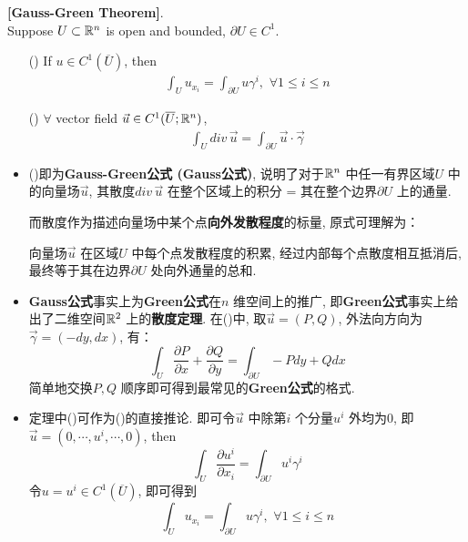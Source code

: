 	\begin{thm}\label{thm 1.6.1}
		\textbf{[Gauss-Green Theorem]}. \\
		Suppose $U \subset \mathbb{R}^n$ is open and bounded, $\partial U \in C^1$.
		\begin{enumerate}
			\item[(\rmnum{1})] If $u \in C^{1}(\overline{U})$, then
			\begin{align}
				\int_{U} u_{x_i} = \int_{\partial U} u \gamma^i , \,\, \forall 1 \leq i \leq n
			\end{align}
			
			\item[(\rmnum{2})] $\forall$ vector field $\vec{u} \in C^{1}(\overline{U} ; \mathbb{R}^n)$,
			\begin{align}
				\int_{U} div \, \vec{u} = \int_{\partial U} \vec{u} \cdot \vec{\gamma}
			\end{align}
		\end{enumerate}
		
		\vspace{2em}
		
		\begin{rmk}
			\begin{itemize}
				\item ()即为\textbf{Gauss-Green公式 (Gauss公式)}, 说明了对于$\mathbb{R}^n$ 中任一有界区域$U$ 中的向量场$\vec{u}$, 其散度$div \, \vec{u}$ 在整个区域上的积分 = 其在整个边界$\partial U$ 上的通量.
				
				\vspace{1em}
				
				而散度作为描述向量场中某个点\textbf{向外发散程度}的标量, 原式可理解为：
				\begin{center}
					向量场$\vec{u}$ 在区域$U$ 中每个点发散程度的积累, 经过内部每个点散度相互抵消后, 最终等于其在边界$\partial U$ 处向外通量的总和.
				\end{center}
			
				\newpage
				
				\item \textbf{Gauss公式}事实上为\textbf{Green公式}在$n$ 维空间上的推广, 即\textbf{Green公式}事实上给出了二维空间$\mathbb{R}^2$ 上的\textbf{散度定理}. 在()中, 取$\vec{u} = (P , Q)$, 外法向方向为$\vec{\gamma} = (-dy , dx)$, 有：
				\[ \int_{U} \frac{\partial P}{\partial x} + \frac{\partial Q}{\partial y} 
				= \int_{\partial U} -P dy + Q dx \]
				简单地交换$P , Q$ 顺序即可得到最常见的\textbf{Green公式}的格式.
				
				\vspace{6em}
				
				\item 定理中()可作为()的直接推论. 即可令$\vec{u}$ 中除第$i$ 个分量$u^i$ 外均为0, 即$\vec{u} = (0 , \cdots , u^i , \cdots , 0)$, then
				\[ \int_{U} \frac{\partial u^i}{\partial x_i} = \int_{\partial U} u^i \gamma^i \]
				令$u = u^i \in C^{1}(\overline{U})$, 即可得到
				\[ \int_{U} u_{x_i} = \int_{\partial U} u \gamma^i , \,\, \forall 1 \leq i \leq n \]
			\end{itemize}
		\end{rmk}
	\end{thm}

